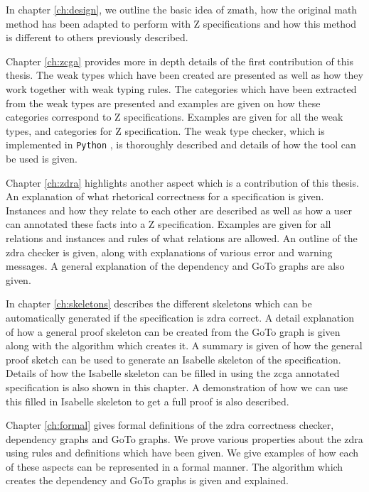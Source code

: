 In chapter \ref{ch:design}, we outline the basic idea of \gls{zmath}, how the original \gls{math} method has been adapted to perform with Z specifications and how this method is different to others previously described.

Chapter \ref{ch:zcga} provides more in depth details of the first contribution of this thesis. The weak types which have been created are presented as well as how they work together with weak typing rules. The categories which have been extracted from the weak types are presented and examples are given on how these categories correspond to Z specifications. Examples are given for all the weak types, and categories for Z specification. The weak type checker, which is implemented in \texttt{Python} \cite{Python}, is thoroughly described and details of how the tool can be used is given.

Chapter \ref{ch:zdra} highlights another aspect which is a contribution of this thesis. An explanation of what rhetorical correctness for a specification is given. Instances and how they relate to each other are described as well as how a user can annotated these facts into a Z specification. Examples are given for all relations and instances and rules of what relations are allowed. An outline of the \gls{zdra} checker is given, along with explanations of various error and warning messages. A general explanation of the dependency and GoTo graphs are also given.

In chapter \ref{ch:skeletons} describes the different skeletons which can be automatically generated if the specification is \gls{zdra} correct. A detail explanation of how a general proof skeleton can be created from the GoTo graph is given along with the algorithm which creates it. A summary is given of how the general proof sketch can be used to generate an Isabelle skeleton of the specification. Details of how the Isabelle skeleton can be filled in using the \gls{zcga} annotated specification is also shown in this chapter. A demonstration of how we can use this filled in Isabelle skeleton to get a full proof is also described.

Chapter \ref{ch:formal} gives formal definitions of the \gls{zdra} correctness checker, dependency graphs and GoTo graphs. We prove various properties about the \gls{zdra} using rules and definitions which have been given. We give examples of how each of these aspects can be represented in a formal manner. The algorithm which creates the dependency and GoTo graphs is given and explained.

